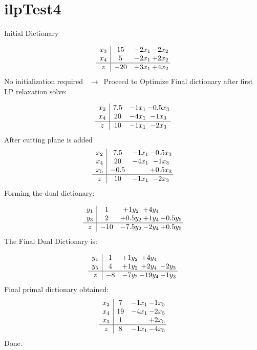 \documentclass[11pt]{article}
\begin{document}
\section{ilpTest4}

Initial Dictionary 

\[\begin{array}{c| c c@{\hskip 2pt} c@{\hskip 2pt} }
 x_{3}   &  15 & -2 x_{1} & -2 x_{2}\\
 x_{4}   &  5 & -2 x_{1} & + 2 x_{2}\\
\hline
z    &  -20 & + 3 x_{1} & + 4 x_{2}\\
\end{array}\]
No initialization required \ $\rightarrow$\  Proceed to Optimize 
Final dictionary after first LP relaxation solve: 

\[\begin{array}{c| c c@{\hskip 2pt} c@{\hskip 2pt} }
 x_{2}   &  7.5 & -1 x_{1} & -0.5 x_{3}\\
 x_{4}   &  20 & -4 x_{1} & -1 x_{3}\\
\hline
z    &  10 & -1 x_{1} & -2 x_{3}\\
\end{array}\]
 After cutting plane is added 
\[\begin{array}{c| c c@{\hskip 2pt} c@{\hskip 2pt} }
 x_{2}   &  7.5 & -1 x_{1} & -0.5 x_{3}\\
 x_{4}   &  20 & -4 x_{1} & -1 x_{3}\\
 x_{5}   &  -0.5  &   & + 0.5 x_{3}\\
\hline
z    &  10 & -1 x_{1} & -2 x_{3}\\
\end{array}\]
Forming the dual dictionary:

\[\begin{array}{c| c c@{\hskip 2pt} c@{\hskip 2pt} c@{\hskip 2pt} }
 y_{1}   &  1 & + 1 y_{2} & + 4 y_{4} &   \\
 y_{3}   &  2 & + 0.5 y_{2} & + 1 y_{4} & -0.5 y_{5}\\
\hline
z    &  -10 & -7.5 y_{2} & -2 y_{4} & + 0.5 y_{5}\\
\end{array}\]
The Final Dual Dictionary is: 

\[\begin{array}{c| c c@{\hskip 2pt} c@{\hskip 2pt} c@{\hskip 2pt} }
 y_{1}   &  1 & + 1 y_{2} & + 4 y_{4} &   \\
 y_{5}   &  4 & + 1 y_{2} & + 2 y_{4} & -2 y_{3}\\
\hline
z    &  -8 & -7 y_{2} & -19 y_{4} & -1 y_{3}\\
\end{array}\]
 Final primal dictionary obtained: 
\[\begin{array}{c| c c@{\hskip 2pt} c@{\hskip 2pt} }
 x_{2}   &  7 & -1 x_{1} & -1 x_{5}\\
 x_{4}   &  19 & -4 x_{1} & -2 x_{5}\\
 x_{3}   &  1  &   & + 2 x_{5}\\
\hline
z    &  8 & -1 x_{1} & -4 x_{5}\\
\end{array}\]
Done.
\end{document}
